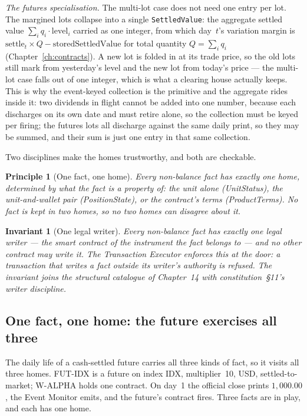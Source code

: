 \documentclass[11pt,a4paper]{article}
\newtheorem{principle}[definition]{Principle}
\newtheorem{invariant}[definition]{Invariant}
\begin{document}
\emph{The futures specialisation.} The multi-lot case does not need one entry per lot. The
margined lots collapse into a single \texttt{SettledValue}: the aggregate settled value
$\sum_i q_i \cdot \text{level}_i$ carried as one integer, from which day~$t$'s variation
margin is $\text{settle}_t \times Q - \text{storedSettledValue}$ for total quantity
$Q=\sum_i q_i$ (Chapter~\ref{ch:contracts}). A new lot is folded in at its trade price, so the
old lots still mark from yesterday's level and the new lot from today's price --- the
multi-lot case falls out of one integer, which is what a clearing house actually keeps. This
is why the event-keyed collection is the primitive and the aggregate rides inside it: two
dividends in flight cannot be added into one number, because each discharges on its own date
and must retire alone, so the collection must be keyed per firing; the futures lots all
discharge against the same daily print, so they may be summed, and their sum is just one entry
in that same collection.

Two disciplines make the homes trustworthy, and both are checkable.

\begin{principle}[One fact, one home]\label{prin:one-home}
Every non-balance fact has exactly one home, determined by what the fact is a property of:
the unit alone (UnitStatus), the unit-and-wallet pair (PositionState), or the contract's
terms (ProductTerms). No fact is kept in two homes, so no two homes can disagree about it.
\end{principle}

\begin{invariant}[One legal writer]\label{inv:one-writer}
Every non-balance fact has exactly one legal writer --- the smart contract of the
instrument the fact belongs to --- and no other contract may write it. The Transaction
Executor enforces this at the door: a transaction that writes a fact outside its writer's
authority is refused. The invariant joins the structural catalogue of
Chapter~14 with constitution~\S 11's writer discipline.
\end{invariant}

\subsection{One fact, one home: the future exercises all three}

The daily life of a cash-settled future carries all three kinds of fact, so it visits all
three homes. FUT-IDX is a future on index IDX, multiplier~10, USD, settled-to-market;
W-ALPHA holds one contract. On day~1 the official close prints $1{,}000.00$, the Event
Monitor emits, and the future's contract fires. Three facts are in play, and each has one
home.
\end{document}
